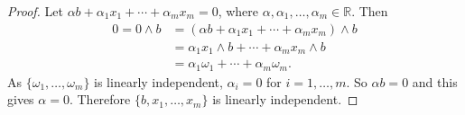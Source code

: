 \documentclass[10pt,a4paper]{amsart}
\begin{document}
\begin{proof}
Let $\alpha b+\alpha_1x_1+\cdots + \alpha_m x_m=0$, where $\alpha,\alpha_1,\ldots, \alpha_m \in \mathbb R.$ Then 
\begin{align*}
0=0\wedge b&=(\alpha b+\alpha_1x_1+\cdots +\alpha_mx_m)\wedge b\\
&=\alpha_1x_1\wedge b+\cdots +\alpha_mx_m\wedge b\\
&=\alpha_1\omega_1+\cdots +\alpha_m\omega_m.
\end{align*}
As $\{\omega_1,\ldots , \omega_m\}$ is  linearly independent, $\alpha_i=0$ for $i=1,\ldots, m.$ So $\alpha b=0$ and this gives $\alpha=0.$ Therefore $\{b,x_1,\ldots, x_m\}$ is linearly independent.
\end{proof}
\end{document}
